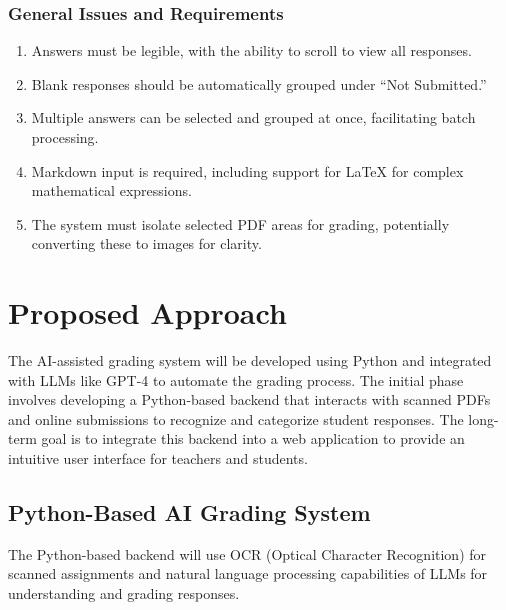 \documentclass[ms,twoside,print]{nuthesis}
\begin{document}
\subsubsection{General Issues and Requirements}
\begin{enumerate}
    \item Answers must be legible, with the ability to scroll to view all responses.
    \item Blank responses should be automatically grouped under “Not Submitted.”
    \item Multiple answers can be selected and grouped at once, facilitating batch processing.
    \item Markdown input is required, including support for LaTeX for complex mathematical expressions.
    \item The system must isolate selected PDF areas for grading, potentially converting these to images for clarity.
\end{enumerate}

\section{Proposed Approach}

The AI-assisted grading system will be developed using Python and integrated with LLMs like GPT-4 to automate the grading process. The initial phase involves developing a Python-based backend that interacts with scanned PDFs and online submissions to recognize and categorize student responses. The long-term goal is to integrate this backend into a web application to provide an intuitive user interface for teachers and students.

\subsection{Python-Based AI Grading System}
The Python-based backend will use OCR (Optical Character Recognition) for scanned assignments and natural language processing capabilities of LLMs for understanding and grading responses.
\end{document}
